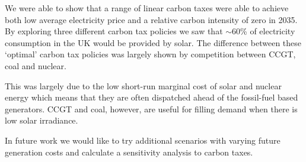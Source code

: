 \documentclass[sigconf]{acmart}
\begin{document}
We were able to show that a range of linear carbon taxes were able to achieve both low average electricity price and a relative carbon intensity of zero in 2035. By exploring three different carbon tax policies we saw that ${\sim}$60\% of electricity consumption in the UK would be provided by solar. The difference between these `optimal' carbon tax policies was largely shown by competition between CCGT, coal and nuclear.

This was largely due to the low short-run marginal cost of solar and nuclear energy which means that they are often dispatched ahead of the fossil-fuel based generators. CCGT and coal, however, are useful for filling demand when there is low solar irradiance.

In future work we would like to try additional scenarios with varying future generation costs and calculate a sensitivity analysis to carbon taxes.







\appendix
\end{document}
